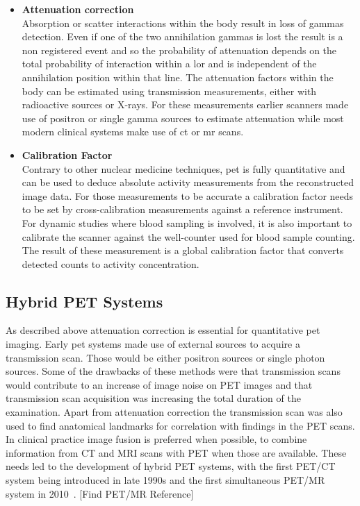\begin{itemize}
\item\textbf{Attenuation correction}\\
Absorption or scatter interactions within the body result in loss of gammas detection. Even if one of the two annihilation gammas is lost the result is a non registered event and so the probability of attenuation depends on the total probability of interaction within a \gls{lor} and is independent of the annihilation position within that line. The attenuation factors within the body can be estimated using transmission measurements, either with radioactive sources or X-rays. For these measurements earlier scanners made use of positron or single gamma sources to estimate attenuation while most modern clinical systems make use of \gls{ct} or \gls{mr} scans. 
\item\textbf{Calibration Factor}\\
Contrary to other nuclear medicine techniques, \gls{pet} is fully quantitative and can be used to deduce absolute activity measurements from the reconstructed image data. For those measurements to be accurate a calibration factor needs to be set by cross-calibration measurements against a reference instrument. For dynamic studies where blood sampling is involved, it is also important to calibrate the scanner against the well-counter used for blood sample counting. The result of these measurement is a global calibration factor that converts detected counts to activity concentration. 
\end{itemize}


\subsection{Hybrid PET Systems}
As described above attenuation correction is essential for quantitative \gls{pet} imaging. Early \gls{pet} systems made use of external sources to acquire a transmission scan. Those would be either positron sources or single photon sources. Some of the drawbacks of these methods were that transmission scans would contribute to an increase of image noise on PET images and that transmission scan acquisition was increasing the total duration of the examination. 
Apart from attenuation correction the transmission scan was also used to find anatomical landmarks for correlation with findings in the PET scans. In clinical practice image fusion is preferred when possible, to combine information from CT and MRI scans with PET when those are available. 
These needs led to the development of hybrid PET systems, with the first PET/CT system being introduced in late 1990s and the first simultaneous PET/MR system in 2010~\cite{Townsend2008}. [Find PET/MR Reference]


